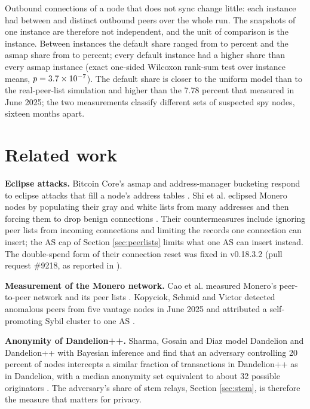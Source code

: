 \documentclass[english]{mrl}
\theoremstyle{plain}
\begin{document}
Outbound connections of a node that does not sync change little: each instance had between \abPeersMin{} and \abPeersMax{} distinct outbound peers over the whole run. The snapshots of one instance are therefore not independent, and the unit of comparison is the instance. Between instances the default share ranged from \abCtrlMin{} to \abCtrlMax{} percent and the asmap share from \abAsmapMin{} to \abAsmapMax{} percent; every default instance had a higher share than every asmap instance (exact one-sided Wilcoxon rank-sum test over instance means, $p=3.7\times10^{-7}$). The default share is closer to the uniform model than to the real-peer-list simulation and higher than the 7.78 percent that \cite{Kopyciok2026} measured in June 2025; the two measurements classify different sets of suspected spy nodes, sixteen months apart.

\section{Related work\label{sec:related}}

\textbf{Eclipse attacks.} Bitcoin Core's asmap and address-manager bucketing respond to eclipse attacks that fill a node's address tables \cite{Heilman2015,Tran2020,BitcoinPR16702}. Shi et al. eclipsed Monero nodes by populating their gray and white lists from many addresses and then forcing them to drop benign connections \cite{Shi2025}. Their countermeasures include ignoring peer lists from incoming connections and limiting the records one connection can insert; the AS cap of Section \ref{sec:peerlists} limits what one AS can insert instead. The double-spend form of their connection reset was fixed in v0.18.3.2 (pull request \#9218, as reported in \cite{Shi2025}).

\textbf{Measurement of the Monero network.} Cao et al. measured Monero's peer-to-peer network and its peer lists \cite{Cao2020}. Kopyciok, Schmid and Victor detected anomalous peers from five vantage nodes in June 2025 and attributed a self-promoting Sybil cluster to one AS \cite{Kopyciok2026}.

\textbf{Anonymity of Dandelion++.} Sharma, Gosain and Diaz model Dandelion and Dandelion++ with Bayesian inference and find that an adversary controlling 20 percent of nodes intercepts a similar fraction of transactions in Dandelion++ as in Dandelion, with a median anonymity set equivalent to about 32 possible originators \cite{Sharma2022}. The adversary's share of stem relays, Section \ref{sec:stem}, is therefore the measure that matters for privacy.
\end{document}
